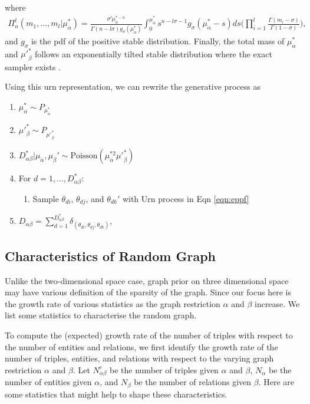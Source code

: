 \documentclass{article}
\begin{document}
where
\begin{align}
\Pi_{n}^l(m_1, ..., m_l|\mu_\alpha^*) = \frac{\sigma^l \mu_\alpha^{*-n}}{\Gamma(n-l\sigma)g_{\sigma}(\mu_\alpha^*)} \int_{0}^{\mu_\alpha^*}s^{n-l\sigma-1}g_{\sigma}(\mu_\alpha^*-s)ds \bigg(\prod_{i=1}^{l} \frac{\Gamma(m_i-\sigma)}{\Gamma(1-\sigma)} \bigg),
\end{align}
and $g_\sigma$ is the pdf of the positive stable distribution.
Finally, the total mass of $\mu_\alpha^*$ and ${\mu'}_\beta^{*}$ follows an exponentially tilted stable distribution where the exact sampler exists \citep{devroye2009random,hofert2011sampling}. 

Using this urn representation, we can rewrite the generative process as
\begin{enumerate}
\item $\mu_\alpha^* \sim P_{\mu_\alpha^*}$
\item ${\mu'}_\beta^{*} \sim P_{{\mu'}_\beta^{*}}$
\item $D_{\alpha\beta}^* | \mu_\alpha, \mu_\beta' \sim \text{Poisson}(\mu_\alpha^{*2}{\mu'}_\beta^{*})$
\item For $d=1,...,D_{\alpha\beta}^*$:
\begin{enumerate}
\item Sample $\theta_{di}$, $\theta_{dj}$, and $\theta_{dk}'$ with Urn process in Eqn \ref{eqn:eppf}
\end{enumerate}
\item $D_{\alpha\beta} = \sum_{d=1}^{D_{\alpha\beta}^*} \delta_{(\theta_{di}, \theta_{dj}, \theta_{dk})}$,
\end{enumerate}

\subsection{Characteristics of Random Graph}
Unlike the two-dimensional space case, graph prior on three dimensional space may have various definition of the sparsity of the graph. Since our focus here is the growth rate of various statistics as the graph restriction $\alpha$ and $\beta$ increase. We list some statistics to characterise the random graph.

To compute the (expected) growth rate of the number of triples with respect to the number of entities and relations, we first identify the growth rate of the number of triples, entities, and relations with respect to the varying graph restriction $\alpha$ and $\beta$. Let $N^{e}_{\alpha\beta}$ be the number of triples given $\alpha$ and $\beta$, $N_{\alpha}$ be the number of entities given $\alpha$, and $N_{\beta}$ be the number of relations given $\beta$. Here are some statistics that might help to shape these characteristics.
\end{document}
